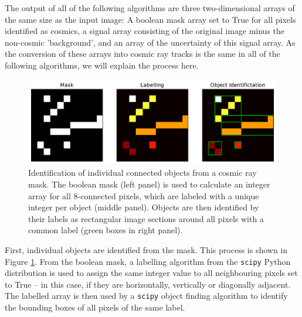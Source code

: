 \documentclass[a4paper, 11pt]{article}
\begin{document}
The output of all of the following algorithms are three two-dimensional arrays of the same size as the input image: A boolean mask array set to True for all pixels identified as cosmics, a signal array consisting of the original image minus the non-cosmic 'background', and an array of the uncertainty of this signal array. As the conversion of these arrays into cosmic ray tracks is the same in all of the following algorithms, we will explain the process here. 

\begin{figure}
  \centering
  \includegraphics[width=\textwidth]{images/extraction/TrackObs_Objects}
  \caption{Identification of individual connected objects from a cosmic ray mask. The boolean mask (left panel) is used to calculate an integer array for all 8-connected pixels, which are labeled with a unique integer per object (middle panel). Objects are then identified by their labels as rectangular image sections around all pixels with a common label (green boxes in right panel).}
  \label{fig:TrackObs_Objects}
\end{figure}

First, individual objects are identified from the mask. This process is shown in Figure \ref{fig:TrackObs_Objects}. From the boolean mask, a labelling algorithm from the \texttt{scipy} Python distribution is used to assign the same integer value to all neighbouring pixels set to True -- in this case, if they are horizontally, vertically or diagonally adjacent. The labelled array is then used by a \texttt{scipy} object finding algorithm to identify the bounding boxes of all pixels of the same label.
\end{document}
